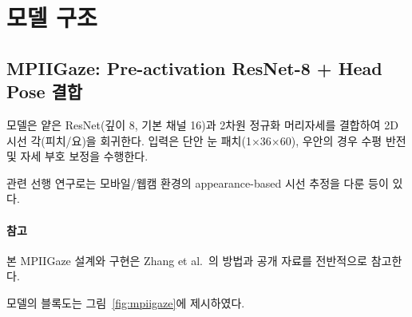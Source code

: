 \documentclass[10pt,a4paper]{article}
\begin{document}
\section{모델 구조}
\subsection{MPIIGaze: Pre-activation ResNet-8 + Head Pose 결합}
모델은 얕은 ResNet(깊이 8, 기본 채널 16)과 2차원 정규화 머리자세를 결합하여 2D 시선 각(피치/요)을 회귀한다. 입력은 단안 눈 패치(1$\times$36$\times$60), 우안의 경우 수평 반전 및 자세 부호 보정을 수행한다.

관련 선행 연구로는 모바일/웹캠 환경의 appearance-based 시선 추정을 다룬 \cite{Krafka2016,Zhang2015Wild,Zhang2020ETHXGaze,Rakhmatulin2020LowCost} 등이 있다.
\paragraph{참고} 본 MPIIGaze 설계와 구현은 Zhang et al.~\cite{Zhang2017MPIIGaze}의 방법과 공개 자료를 전반적으로 참고한다.

모델의 블록도는 그림~\ref{fig:mpiigaze}에 제시하였다.
\end{document}
